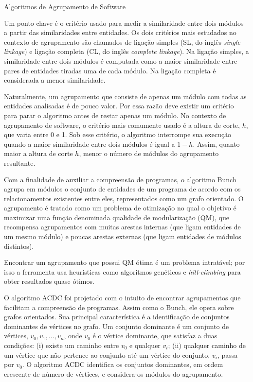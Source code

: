 \begin{section}{Algoritmos de Agrupamento de Software}

Um ponto chave é o critério usado para medir a similaridade entre dois módulos a partir das similaridades entre entidades. Os dois critérios mais estudados no contexto de agrupamento são chamados de ligação simples (SL, do inglês \emph{single linkage}) e ligação completa (CL, do inglês \emph{complete linkage}). Na ligação simples, a similaridade entre dois módulos é computada como a maior similaridade entre pares de entidades tiradas uma de cada módulo. Na ligação completa é considerada a menor similaridade.

Naturalmente, um agrupamento que consiste de apenas um módulo com todas as entidades analisadas é de pouco valor. Por essa razão deve existir um critério para parar o algoritmo antes de restar apenas um módulo. No contexto de agrupamento de software, o critério mais comumente usado é a altura de corte, $h$, que varia entre 0 e 1. Sob esse critério, o algoritmo interrompe sua execução quando a maior similaridade entre dois módulos é igual a $1 - h$. Assim, quanto maior a altura de corte $h$, menor o número de módulos do agrupamento resultante.


Com a finalidade de auxiliar a compreensão de programas, o algoritmo Bunch \cite{Mancoridis1998} agrupa em módulos o conjunto de entidades de um programa de acordo com os relacionamentos existentes entre eles, representados como um grafo orientado. O agrupamento é tratado como um problema de otimização no qual o objetivo é maximizar uma função denominada qualidade de modularização (QM), que recompensa agrupamentos com muitas arestas internas (que ligam entidades de um mesmo módulo) e poucas arestas externas (que ligam entidades de módulos distintos).

Encontrar um agrupamento que possui QM ótima é um problema intratável; por isso a ferramenta usa heurísticas como algoritmos genéticos e \emph{hill-climbing} para obter resultados quase ótimos.


O algoritmo ACDC \cite{Tzerpos2000} foi projetado com o intuito de encontrar agrupamentos que facilitam a compreensão de programas. Assim como o Bunch, ele opera sobre grafos orientados. Sua principal característica é a identificação de conjuntos dominantes de vértices no grafo. Um conjunto dominante é um conjunto de vértices, $v_0, v_1, \ldots{}, v_n$, onde $v_0$ é o vértice dominante, que satisfaz a duas condições: (i) existe um caminho entre $v_0$ e qualquer $v_i$; (ii) qualquer caminho de um vértice que não pertence ao conjunto até um vértice do conjunto, $v_i$, passa por $v_0$. O algoritmo ACDC identifica os conjuntos dominantes, em ordem crescente de número de vértices, e considera-os módulos do agrupamento. 


\end{section}

